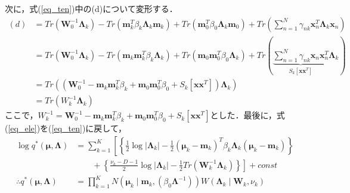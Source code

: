 \documentclass[uplatex]{jsarticle}
\begin{document}
次に，式(\ref{eq_ten})中の(d)について変形する．
\begin{align}
\label{eq_ele}
(d) &= Tr(\bm{W}_0^{-1}\bm{\Lambda}_k) - Tr(\bm{m}_k^T\beta_k\bm{\Lambda}_k\bm{m}_k) + Tr(\bm{m}_0^T\beta_0\bm{\Lambda}_k\bm{m}_0) + Tr(\sum_{n=1}^N \gamma_{nk}\bm{x}_n^T\bm{\Lambda}_k\bm{x}_n) \nonumber \\
    &= Tr(\bm{W}_0^{-1}\bm{\Lambda}_k) - Tr(\bm{m}_k\bm{m}_k^T\beta_k\bm{\Lambda}_k) + Tr(\bm{m}_0\bm{m}_0^T\beta_0\bm{\Lambda}_k) + Tr(\underbrace{\sum_{n=1}^N \gamma_{nk}\bm{x}_n\bm{x}_n^T}_{S_k[\bm{x}\bm{x}^T]}\bm{\Lambda}_k) \nonumber \\
    &= Tr((\bm{W}_0^{-1} - \bm{m}_k\bm{m}_k^T\beta_k + \bm{m}_0\bm{m}_0^T\beta_0 + S_k[\bm{x}\bm{x}^T])\bm{\Lambda}_k) \nonumber \\
    &= Tr(W_k^{-1}\bm{\Lambda}_k)
\end{align}
ここで，$W_k^{-1} = \bm{W}_0^{-1} - \bm{m}_k\bm{m}_k^T\beta_k + \bm{m}_0\bm{m}_0^T\beta_0 + S_k[\bm{x}\bm{x}^T]$とした．最後に，式(\ref{eq_ele})を(\ref{eq_ten})に戻して，
\begin{align}
\log q^* (\bm{\mu}, \bm{\Lambda}) &= \sum_{k=1}^K \left[ \left\{ \frac{1}{2}\log|\bm{\Lambda}_k| - \frac{1}{2}(\bm{\mu}_k-\bm{m}_k)^T\beta_k\bm{\Lambda}_k(\bm{\mu}_k-\bm{m}_k) \right\} \right. \nonumber \\
 &\qquad+ \left. \left\{ \frac{\nu_k - D - 1}{2}\log|\bm{\Lambda}_k| - \frac{1}{2} Tr(\bm{W}_k^{-1}\bm{\Lambda}_k) \right\} \right] + const \nonumber \\
 \therefore q^*(\bm{\mu}, \bm{\Lambda}) &= \prod_{k=1}^K N(\bm{\mu}_k \mid \bm{m}_k, (\beta_0\bm{\Lambda}^{-1}))W(\bm{\Lambda}_k \mid \bm{W}_k, \nu_k)
\end{align}
\end{document}
